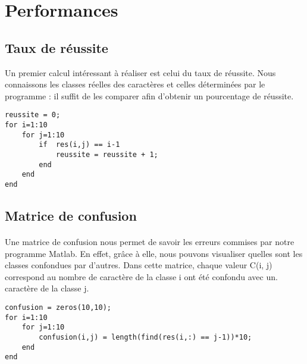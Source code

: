 \section{Performances}

\subsection{Taux de réussite}
Un premier calcul intéressant à réaliser est celui du taux de réussite. Nous connaissons les classes réelles des caractères et celles déterminées par le 
programme : il suffit de les comparer afin d'obtenir un pourcentage de réussite.
\\
\begin{lstlisting}
reussite = 0;
for i=1:10
	for j=1:10
		if  res(i,j) == i-1
			reussite = reussite + 1;
		end
	end
end
\end{lstlisting}

\subsection{Matrice de confusion}

\paragraph{}
Une matrice de confusion nous permet de savoir les erreurs commises par notre programme Matlab. En effet, grâce à elle, nous pouvons visualiser quelles sont 
les classes confondues par d'autres. Dans cette matrice, chaque valeur C(i, j) correspond au nombre de caractère de la classe i ont été confondu avec un. 
caractère de la classe j.
\\
\begin{lstlisting}
confusion = zeros(10,10);
for i=1:10
    for j=1:10
        confusion(i,j) = length(find(res(i,:) == j-1))*10;
    end
end
\end{lstlisting}

